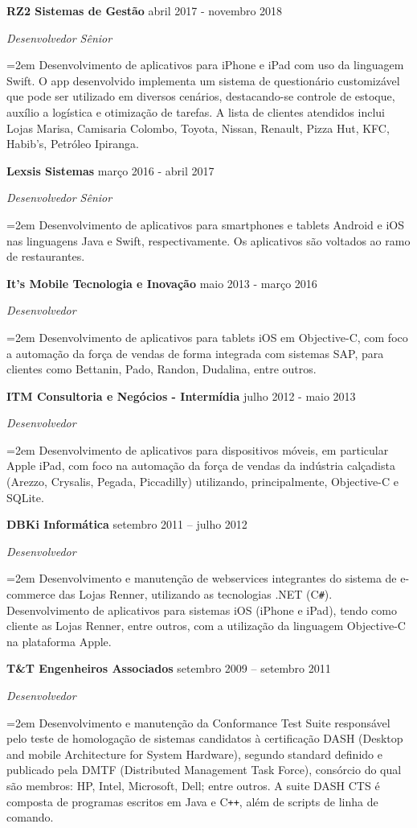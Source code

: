 \documentclass[paper=a4,fontsize=11pt]{scrartcl} %
\newcommand{\sepspace}{\vspace*{1em}}		%
\newcommand{\EducationEntry}[4]{
		\noindent \textbf{#1} \hfill      %
        #2 \par
		\noindent \textit{#3} \par        %
		\noindent\hangindent=2em\hangafter=0 \small #4 %
		\normalsize \par}
\newcommand{\WorkEntry}[4]{				  %
		\noindent \textbf{#1} \hfill      %
        #2 \par
		\noindent \textit{#3} \par        %
		\noindent\hangindent=2em\hangafter=0 \small #4 %
		\normalsize \par}
\begin{document}
\WorkEntry{RZ2 Sistemas de Gestão}{abril 2017 - novembro 2018}{Desenvolvedor Sênior}{Desenvolvimento de aplicativos para iPhone e iPad com uso da linguagem Swift. O app desenvolvido implementa um sistema de questionário customizável que pode ser utilizado em diversos cenários, destacando-se controle de estoque, auxílio a logística e otimização de tarefas. A lista de clientes atendidos inclui Lojas Marisa, Camisaria Colombo, Toyota, Nissan, Renault, Pizza Hut, KFC, Habib’s, Petróleo Ipiranga.}
\sepspace
\sepspace

\WorkEntry{Lexsis Sistemas}{março 2016 - abril 2017}{Desenvolvedor Sênior}{Desenvolvimento de aplicativos para smartphones e tablets Android e iOS nas linguagens Java e Swift, respectivamente. Os aplicativos são voltados ao ramo de restaurantes.}
\sepspace
\sepspace

\WorkEntry{It’s Mobile Tecnologia e Inovação}{maio 2013 - março 2016}{Desenvolvedor}{Desenvolvimento de aplicativos para tablets iOS em Objective-C, com foco a automação da força de vendas de forma integrada com sistemas SAP, para clientes como Bettanin, Pado, Randon, Dudalina, entre outros.}

\newpage

\WorkEntry{ITM Consultoria e Negócios - Intermídia}{julho 2012 - maio 2013}{Desenvolvedor}{Desenvolvimento de aplicativos para dispositivos móveis, em particular Apple iPad, com foco na automação da força de vendas da indústria calçadista (Arezzo, Crysalis, Pegada, Piccadilly) utilizando, principalmente, Objective-C e SQLite.}
\sepspace
\sepspace

\WorkEntry{DBKi Informática}{setembro 2011 – julho 2012}{Desenvolvedor}{Desenvolvimento e manutenção de webservices integrantes do sistema de e-commerce das Lojas Renner, utilizando as tecnologias .NET (C\texttt{\#}). Desenvolvimento de aplicativos para sistemas iOS (iPhone e iPad), tendo como cliente as Lojas Renner, entre outros, com a utilização da linguagem Objective-C na plataforma Apple.}
\sepspace
\sepspace

\WorkEntry{T\&T Engenheiros Associados}{setembro 2009 – setembro 2011}{Desenvolvedor}{Desenvolvimento e manutenção da Conformance Test Suite responsável pelo teste de homologação de sistemas candidatos à certificação DASH (Desktop and mobile Architecture for System Hardware), segundo standard definido e publicado pela DMTF (Distributed Management Task Force), consórcio do qual são membros: HP, Intel, Microsoft, Dell; entre outros. A suite DASH CTS é composta de programas escritos em Java e C\texttt{++}, além de scripts de linha de comando.}
\sepspace
\sepspace
\end{document}
